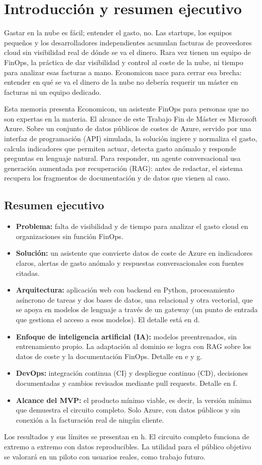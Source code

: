 \section{Introducción y resumen ejecutivo}\label{a-0}

Gastar en la nube es fácil; entender el gasto, no. Las startups, los equipos pequeños y los desarrolladores independientes acumulan facturas de proveedores cloud sin visibilidad real de dónde se va el dinero. Rara vez tienen un equipo de FinOps, la práctica de dar visibilidad y control al coste de la nube, ni tiempo para analizar esas facturas a mano. Economicon nace para cerrar esa brecha: entender en qué se va el dinero de la nube no debería requerir un máster en facturas ni un equipo dedicado.

Esta memoria presenta Economicon, un asistente FinOps para personas que no son expertas en la materia. El alcance de este Trabajo Fin de Máster es Microsoft Azure. Sobre un conjunto de datos públicos de costes de Azure, servido por una interfaz de programación (API) simulada, la solución ingiere y normaliza el gasto, calcula indicadores que permiten actuar, detecta gasto anómalo y responde preguntas en lenguaje natural. Para responder, un agente conversacional usa generación aumentada por recuperación (RAG): antes de redactar, el sistema recupera los fragmentos de documentación y de datos que vienen al caso.

\subsection{Resumen ejecutivo}\label{a-6}

\begin{itemize}
\item \textbf{Problema:} falta de visibilidad y de tiempo para analizar el gasto cloud en organizaciones sin función FinOps.
\item \textbf{Solución:} un asistente que convierte datos de coste de Azure en indicadores claros, alertas de gasto anómalo y respuestas conversacionales con fuentes citadas.
\item \textbf{Arquitectura:} aplicación web con backend en Python, procesamiento asíncrono de tareas y dos bases de datos, una relacional y otra vectorial, que se apoya en modelos de lenguaje a través de un gateway (un punto de entrada que gestiona el acceso a esos modelos). El detalle está en d.
\item \textbf{Enfoque de inteligencia artificial (IA):} modelos preentrenados, sin entrenamiento propio. La adaptación al dominio se logra con RAG sobre los datos de coste y la documentación FinOps. Detalle en e y g.
\item \textbf{DevOps:} integración continua (CI) y despliegue continuo (CD), decisiones documentadas y cambios revisados mediante pull requests. Detalle en f.
\item \textbf{Alcance del MVP:} el producto mínimo viable, es decir, la versión mínima que demuestra el circuito completo. Solo Azure, con datos públicos y sin conexión a la facturación real de ningún cliente.
\end{itemize}

Los resultados y sus límites se presentan en h. El circuito completo funciona de extremo a extremo con datos reproducibles. La utilidad para el público objetivo se valorará en un piloto con usuarios reales, como trabajo futuro.
